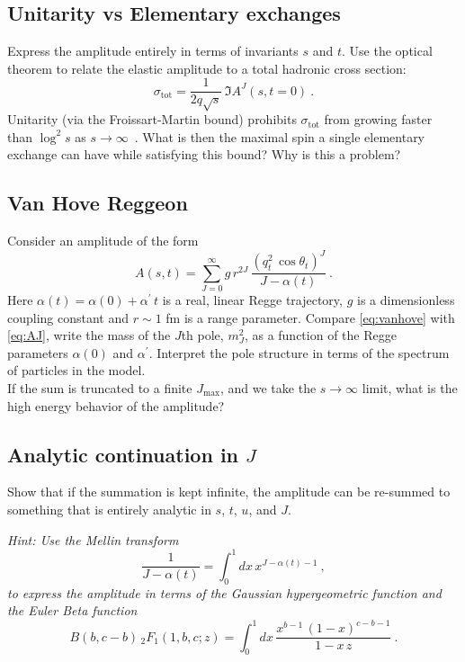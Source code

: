 \subsection{Unitarity vs Elementary exchanges}
Express the amplitude entirely in terms of invariants $s$ and $t$. Use the optical theorem to relate the elastic amplitude to a total hadronic cross section:
\begin{equation}
    \sigma_\text{tot} = \frac{1}{2q\sqrt{s}} \, \Im A^J(s,t=0)~.
\end{equation}
Unitarity (via the Froissart-Martin bound) prohibits $\sigma_\text{tot}$ from growing faster than $\log^2 s$ as $s\to\infty$~. What is then the maximal spin a single elementary exchange can have while satisfying this bound? Why is this a problem?

\subsection{Van Hove Reggeon} 

Consider an amplitude of the form 
    \begin{equation}
        \label{eq:vanhove}
        A(s,t) = \sum_{J=0}^\infty g \, r^{2J} \, \frac{ (q_t^2 \, \cos\theta_t)^J}{J- \alpha(t)} ~.
    \end{equation}
Here $\alpha(t) = \alpha(0) + \alpha^\prime \, t$ is a real, linear Regge trajectory, $g$ is a dimensionless coupling constant and $r \sim 1$ fm is a range parameter. 
Compare \cref{eq:vanhove} with \cref{eq:AJ}, write the mass of the $J$th pole, $m_J^2$, as a function of the Regge parameters $\alpha(0)$ and $\alpha^\prime$. Interpret the pole structure in terms of the spectrum of particles in the model. 
\\

\noindent If the sum is truncated to a finite $J_\text{max}$, and we take the $s\to \infty$ limit, what is the high energy behavior of the amplitude? 

\subsection{Analytic continuation in $J$}
Show that if the summation is kept infinite, the amplitude can be re-summed to something that is entirely analytic in $s$, $t$, $u$, and $J$. 

\noindent \textit{Hint: Use the Mellin transform
    \begin{equation}
        \frac{1}{J-\alpha(t)} = \int_0^1 dx \, x^{J-\alpha(t) - 1} ~,
    \end{equation}
to express the amplitude in terms of the Gaussian hypergeometric function and the Euler Beta function
    \begin{equation}
        B(b, c-b) \, _2F_1(1, b, c; z) =  \int_0^1 dx \, \frac{ x^{b-1} \, (1-x)^{c-b-1}}{1-x \, z} ~. 
    \end{equation}
}

